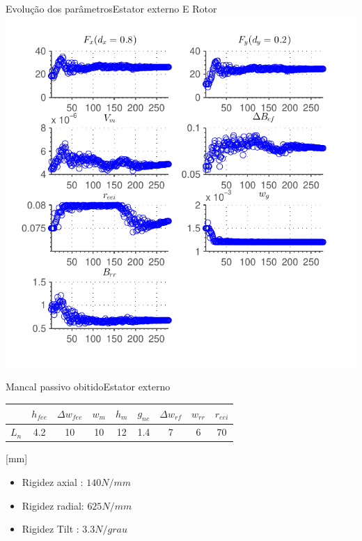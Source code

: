 \documentclass{beamer}
\begin{document}

\begin{frame}{Evolução dos parâmetros}{Estator externo E Rotor}
\centering
	\includegraphics[width=0.8\linewidth]{Simulacoes/Passivo2/otimizacao_passivo_parametros.pdf}
\end{frame}

\begin{frame}{Mancal passivo obitido}{Estator externo}
\centering

	\begin{tabular}{c c c c c c c c c}
		& $h_{fee}$ &$\Delta w_{fee}$ & $w_m$ & $h_m$  & $g_{ne}$ & $\Delta w_{rf}$ & $w_{rr}$ & $r_{eei}$ \\ \hline \hline
		$L_{n}$  	&  4.2 &   10 &   10 &    12 &   1.4 &  7 &   6 &    70 \\
	\end{tabular} 
	
\hfill [mm]
\vspace{8px}
	
\begin{itemize}
	\item Rigidez axial : $140N/mm$
	\item Rigidez radial: $625N/mm$ 
	\item Rigidez Tilt  : $3.3N/grau$
\end{itemize}
	
\end{frame}
\end{document}
